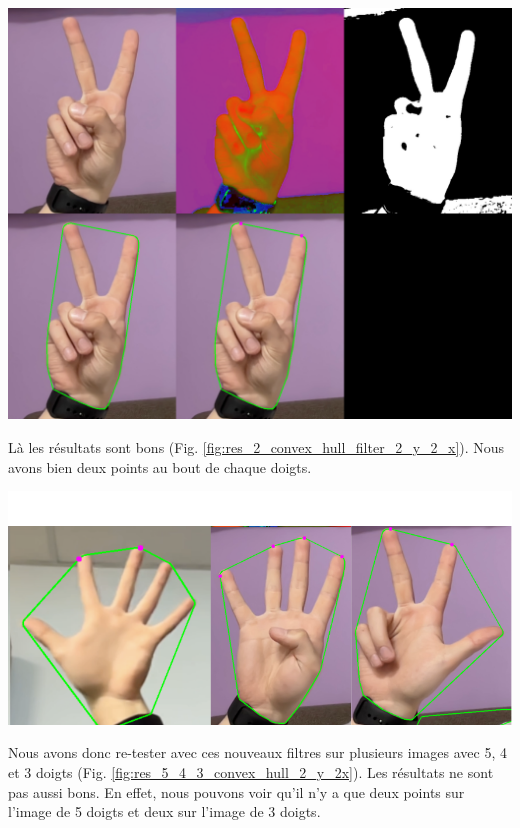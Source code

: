 \documentclass[11pt]{article}
\begin{document}
\begin{center}
    \includegraphics[width=\textwidth]{images/res_2_convex_hull_filter_2_y_2_x.png}
    \label{fig:res_2_convex_hull_filter_2_y_2_x}
\end{center}

Là les résultats sont bons (Fig. \ref{fig:res_2_convex_hull_filter_2_y_2_x}). Nous avons bien deux points au bout de chaque doigts. \bigbreak

\begin{center}
    \includegraphics[width=\textwidth]{images/res_5_4_3_convex_hull_2_y_2x.png}
    \label{fig:res_5_4_3_convex_hull_2_y_2x}
\end{center}

Nous avons donc re-tester avec ces nouveaux filtres sur plusieurs images avec 5, 4 et 3 doigts (Fig. \ref{fig:res_5_4_3_convex_hull_2_y_2x}). Les résultats ne sont pas aussi bons. En effet, nous pouvons voir qu'il n'y a que deux points sur l'image de 5 doigts et deux sur l'image de 3 doigts. 
\end{document}
